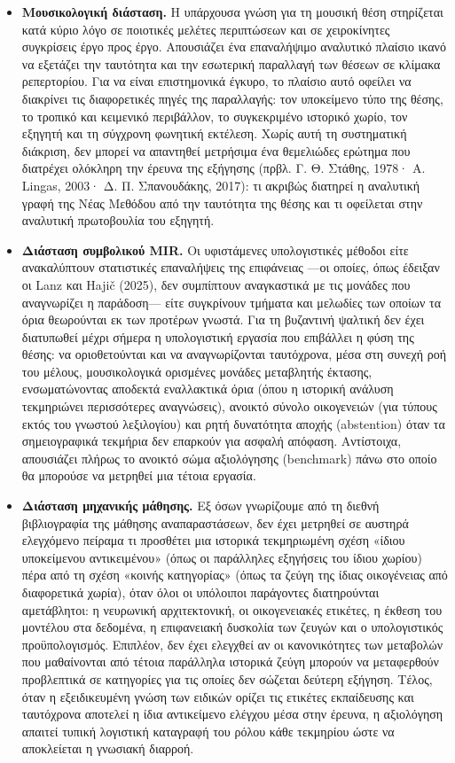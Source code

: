 \documentclass[11pt,a4paper]{article}
\begin{document}
\begin{itemize}
\item
  \textbf{Μουσικολογική διάσταση.} Η υπάρχουσα γνώση για τη μουσική θέση στηρίζεται κατά κύριο λόγο σε ποιοτικές μελέτες περιπτώσεων και σε χειροκίνητες συγκρίσεις έργο προς έργο. Απουσιάζει ένα επαναλήψιμο αναλυτικό πλαίσιο ικανό να εξετάζει την ταυτότητα και την εσωτερική παραλλαγή των θέσεων σε κλίμακα ρεπερτορίου. Για να είναι επιστημονικά έγκυρο, το πλαίσιο αυτό οφείλει να διακρίνει τις διαφορετικές πηγές της παραλλαγής: τον υποκείμενο τύπο της θέσης, το τροπικό και κειμενικό περιβάλλον, το συγκεκριμένο ιστορικό χωρίο, τον εξηγητή και τη σύγχρονη φωνητική εκτέλεση. Χωρίς αυτή τη συστηματική διάκριση, δεν μπορεί να απαντηθεί μετρήσιμα ένα θεμελιώδες ερώτημα που διατρέχει ολόκληρη την έρευνα της εξήγησης (πρβλ. Γ. Θ. Στάθης, 1978· A. Lingas, 2003· Δ. Π. Σπανουδάκης, 2017): τι ακριβώς διατηρεί η αναλυτική γραφή της Νέας Μεθόδου από την ταυτότητα της θέσης και τι οφείλεται στην αναλυτική πρωτοβουλία του εξηγητή.
\item
  \textbf{Διάσταση συμβολικού MIR.} Οι υφιστάμενες υπολογιστικές μέθοδοι είτε ανακαλύπτουν στατιστικές επαναλήψεις της επιφάνειας ---οι οποίες, όπως έδειξαν οι Lanz και Hajič (2025), δεν συμπίπτουν αναγκαστικά με τις μονάδες που αναγνωρίζει η παράδοση--- είτε συγκρίνουν τμήματα και μελωδίες των οποίων τα όρια θεωρούνται εκ των προτέρων γνωστά. Για τη βυζαντινή ψαλτική δεν έχει διατυπωθεί μέχρι σήμερα η υπολογιστική εργασία που επιβάλλει η φύση της θέσης: να οριοθετούνται και να αναγνωρίζονται ταυτόχρονα, μέσα στη συνεχή ροή του μέλους, μουσικολογικά ορισμένες μονάδες μεταβλητής έκτασης, ενσωματώνοντας αποδεκτά εναλλακτικά όρια (όπου η ιστορική ανάλυση τεκμηριώνει περισσότερες αναγνώσεις), ανοικτό σύνολο οικογενειών (για τύπους εκτός του γνωστού λεξιλογίου) και ρητή δυνατότητα αποχής (abstention) όταν τα σημειογραφικά τεκμήρια δεν επαρκούν για ασφαλή απόφαση. Αντίστοιχα, απουσιάζει πλήρως το ανοικτό σώμα αξιολόγησης (benchmark) πάνω στο οποίο θα μπορούσε να μετρηθεί μια τέτοια εργασία.
\item
  \textbf{Διάσταση μηχανικής μάθησης.} Εξ όσων γνωρίζουμε από τη διεθνή βιβλιογραφία της μάθησης αναπαραστάσεων, δεν έχει μετρηθεί σε αυστηρά ελεγχόμενο πείραμα τι προσθέτει μια ιστορικά τεκμηριωμένη σχέση «ίδιου υποκείμενου αντικειμένου» (όπως οι παράλληλες εξηγήσεις του ίδιου χωρίου) πέρα από τη σχέση «κοινής κατηγορίας» (όπως τα ζεύγη της ίδιας οικογένειας από διαφορετικά χωρία), όταν όλοι οι υπόλοιποι παράγοντες διατηρούνται αμετάβλητοι: η νευρωνική αρχιτεκτονική, οι οικογενειακές ετικέτες, η έκθεση του μοντέλου στα δεδομένα, η επιφανειακή δυσκολία των ζευγών και ο υπολογιστικός προϋπολογισμός. Επιπλέον, δεν έχει ελεγχθεί αν οι κανονικότητες των μεταβολών που μαθαίνονται από τέτοια παράλληλα ιστορικά ζεύγη μπορούν να μεταφερθούν προβλεπτικά σε κατηγορίες για τις οποίες δεν σώζεται δεύτερη εξήγηση. Τέλος, όταν η εξειδικευμένη γνώση των ειδικών ορίζει τις ετικέτες εκπαίδευσης και ταυτόχρονα αποτελεί η ίδια αντικείμενο ελέγχου μέσα στην έρευνα, η αξιολόγηση απαιτεί τυπική λογιστική καταγραφή του ρόλου κάθε τεκμηρίου ώστε να αποκλείεται η γνωσιακή διαρροή.

\end{itemize}
\end{document}

